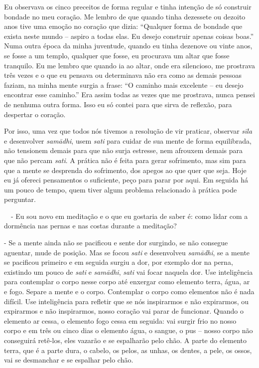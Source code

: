 Eu observava os cinco preceitos de forma regular e tinha intenção de
só construir bondade no meu coração. Me lembro de que quando tinha
dezessete ou dezoito anos tive uma emoção no coração que dizia:
“Qualquer forma de bondade que exista neste mundo – aspiro a todas
elas. Eu desejo construir apenas coisas boas.” Numa outra época da
minha juventude, quando eu tinha dezenove ou vinte anos, se fosse a um
templo, qualquer que fosse, eu procurava um altar que fosse tranquilo.
Eu me lembro que quando ia ao altar, onde era silencioso, me prostrava
três vezes e o que eu pensava ou determinava não era como as demais
pessoas faziam, na minha mente surgia a frase: “O caminho mais
excelente – eu desejo encontrar esse caminho.” Era assim todas as vezes
que me prostrava, nunca pensei de nenhuma outra forma. Isso eu só
contei para que sirva de reflexão, para despertar o coração. 

Por isso, uma vez que todos nós tivemos a resolução de vir praticar,
observar \textit{sīla }e desenvolver \textit{samādhi}, usem
\textit{sati }para cuidar de sua mente de forma equilibrada, não
tensionem demais para que não surja estresse, nem afrouxem demais para
que não percam \textit{sati}. A prática não é feita para gerar
sofrimento, mas sim para que a mente se desprenda do sofrimento, dos
apegos ao que quer que seja. Hoje eu já ofereci pensamentos o
suficiente, peço para parar por aqui. Em seguida há um pouco de tempo,
quem tiver algum problema relacionado à prática pode perguntar.

 \ \ - Eu sou novo em meditação e o que eu gostaria de saber é: como
lidar com a dormência nas pernas e nas costas durante a meditação?

- Se a mente ainda não se pacificou e sente dor surgindo, se não
consegue aguentar, mude de posição. Mas se focou \textit{sati }e
desenvolveu \textit{samādhi}, se a mente se pacificou primeiro e em
seguida surgiu a dor, por exemplo dor na perna, existindo um pouco de
\textit{sati }e \textit{samādhi}, \textit{sati }vai focar naquela
dor. Use inteligência para contemplar o corpo nesse corpo até enxergar
como elemento terra, água, ar e fogo. Separe a mente e o corpo.
Contemplar o corpo como elementos não é nada difícil. Use inteligência
para refletir que se nós inspirarmos e não expirarmos, ou expirarmos e
não inspirarmos, nosso coração vai parar de funcionar. Quando o
elemento ar cessa, o elemento fogo cessa em seguida: vai surgir frio no
nosso corpo e em três ou cinco dias o elemento água, o sangue, o pus –
nosso corpo não conseguirá retê-los, eles vazarão e se espalharão pelo
chão. A parte do elemento terra, que é a parte dura, o cabelo, os
pelos, as unhas, os dentes, a pele, os ossos, vai se desmanchar e se
espalhar pelo chão.

